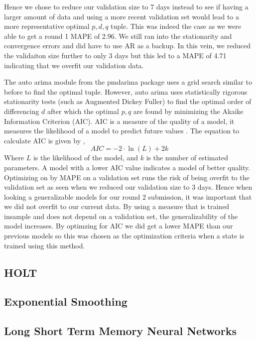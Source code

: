 \documentclass[sigconf,nonacm]{acmart}
\begin{document}
Hence we chose to reduce our validation size to 7 days instead to see if having a larger amount of data and using a more
recent validation set would lead to a more representative optimal $p,d,q$ tuple. This was indeed the case as we were able to
get a round 1 MAPE of 2.96. We still ran into the stationarity and convergence errors and did have to use AR as a backup.
In this vein, we reduced the validaiton size further to only 3 days but this led to a MAPE of 4.71 indicating that we overfit
our validation data. 

The auto arima module from the pmdarima package \cite{pmdarima} uses a grid search similar to before to find the optimal
tuple. However, auto arima uses statistically rigorous stationarity tests (such as Augmented Dickey Fuller) to find 
the optimal order of differencing $d$ after which the optimal $p,q$ are found by minimizing the Akaike Information Criterion (AIC).
AIC is a measure of the quality of a model, it measures the likelihood of a model to predict future values \cite{AIC}. The equation
to calculate AIC is given by \cite{AIC},
\begin{equation}
  AIC  = -2 \cdot \ln(L) + 2k
\end{equation} 
Where $L$ is the likelihood of the model, and $k$ is the number of estimated parameters. A model with a lower AIC value
indicates a model of better quality. Optimizing on by MAPE on a validation set runs the risk of being overfit to the validation
set as seen when we reduced our validation size to 3 days. Hence when looking a generalizable models for our round 2 submission,
it was important that we did not overfit to our current data. By using a measure that is trained insample and does not depend
on a validation set, the generalizability of the model increases. By optimzing for AIC we did get a lower MAPE than our previous
models so this was chosen as the optimization criteria when a state is trained using this method.


\subsection{HOLT}
\subsection{Exponential Smoothing}
\subsection{Long Short Term Memory Neural Networks}
\end{document}
